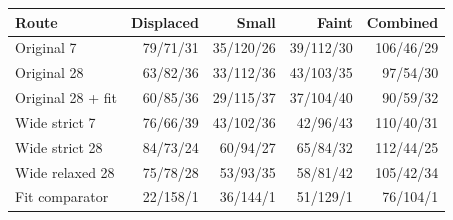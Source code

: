 \begin{tabular}{lrrrr}
\toprule
Route & Displaced & Small & Faint & Combined \\
\midrule
Original 7 & 79/71/31 & 35/120/26 & 39/112/30 & 106/46/29 \\
Original 28 & 63/82/36 & 33/112/36 & 43/103/35 & 97/54/30 \\
Original 28 + fit & 60/85/36 & 29/115/37 & 37/104/40 & 90/59/32 \\
Wide strict 7 & 76/66/39 & 43/102/36 & 42/96/43 & 110/40/31 \\
Wide strict 28 & 84/73/24 & 60/94/27 & 65/84/32 & 112/44/25 \\
Wide relaxed 28 & 75/78/28 & 53/93/35 & 58/81/42 & 105/42/34 \\
Fit comparator & 22/158/1 & 36/144/1 & 51/129/1 & 76/104/1 \\
\bottomrule
\end{tabular}
